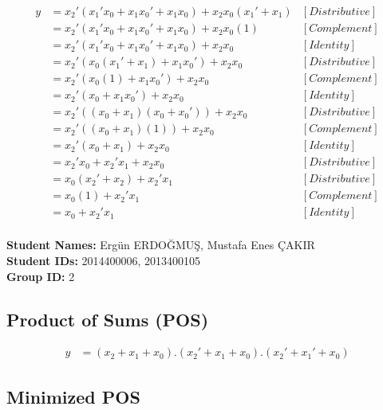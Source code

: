 \documentclass[12pt,a4paper]{report}
\begin{document}
\begin{align*}
	y & = x_2'(x_1' x_0 + x_1 x_0' + x_1 x_0) + x_2 x_0 (x_1' + x_1) &[Distributive]\\
	& = x_2'(x_1' x_0 + x_1 x_0' + x_1 x_0) + x_2 x_0 (1) &[Complement]\\
	& = x_2'(x_1' x_0 + x_1 x_0' + x_1 x_0) + x_2 x_0 &[Identity]\\
	& = x_2'(x_0(x_1' + x_1)+ x_1 x_0') + x_2 x_0 &[Distributive]\\
	& = x_2'(x_0(1)+ x_1 x_0') + x_2 x_0 &[Complement]\\
	& = x_2'(x_0 + x_1 x_0') + x_2 x_0 &[Identity]\\
	& = x_2'((x_0 + x_1) (x_0 + x_0')) + x_2 x_0 &[Distributive]\\
	& = x_2'((x_0 + x_1) (1)) + x_2 x_0 &[Complement]\\
	& = x_2'(x_0 + x_1) + x_2 x_0 &[Identity]\\
	& = x_2'x_0 + x_2'x_1 + x_2x_0 &[Distributive]\\
	& = x_0(x_2' + x_2) + x_2'x_1 &[Distributive]\\
	& = x_0(1) + x_2'x_1 &[Complement]\\
	& = x_0 + x_2'x_1 &[Identity]\\
	&
\end{align*}

\newpage
\noindent
\textbf{Student Names:} Ergün ERDOĞMUŞ, Mustafa Enes ÇAKIR \\
\textbf{Student IDs:} 2014400006, 2013400105 \\
\textbf{Group ID:} 2

\subsection*{Product of Sums (POS)}

\begin{align*}
	y & = (x_2 + x_1 + x_0).(x_2' + x_1 + x_0).(x_2' + x_1' + x_0)
\end{align*}

\subsection*{Minimized POS}
\end{document}
